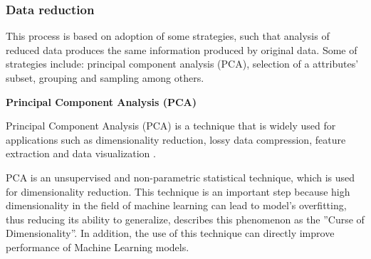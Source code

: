 \subsubsection{Data reduction}

This process is based on adoption of some strategies, such that analysis of reduced data produces the same information produced by original data. Some of strategies include: principal component analysis (PCA), selection of a attributes' subset, grouping and sampling among others.

\vspace{5mm} %

\textbf{Principal Component Analysis (PCA)}

\vspace{5mm} %

Principal Component Analysis (PCA) is a technique that is widely used for applications such as dimensionality reduction, lossy data compression, feature extraction and data visualization \cite{Reference39}.

\vspace{5mm} %

PCA is an unsupervised and non-parametric statistical technique, which is used for dimensionality reduction. This technique is an important step because high dimensionality in the field of machine learning can lead to model's overfitting, thus reducing its ability to generalize,  describes this phenomenon as the ''Curse of Dimensionality''. In addition, the use of this technique can directly improve performance of Machine Learning models.

